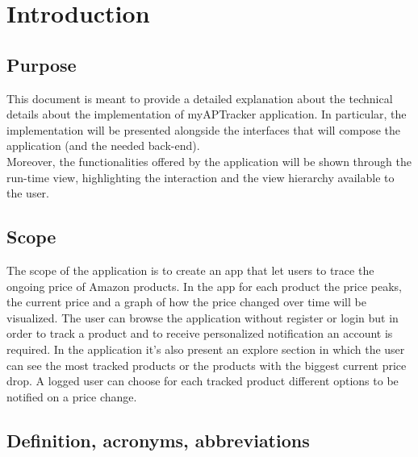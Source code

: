 \section{Introduction}


\subsection{Purpose}

This document is meant to provide a detailed explanation about the technical details about the implementation of myAPTracker application. In particular, the implementation will be presented alongside the interfaces that will compose the application (and the needed back-end). \\
Moreover, the functionalities offered by the application will be shown through the run-time view, highlighting the interaction and the view hierarchy available to the user.

\subsection{Scope}

The scope of the application is to create an app that let users to trace the ongoing price of Amazon products.
In the app for each product the price peaks, the current price and a graph of how the price changed over time will be visualized. The user can browse the application without register or login but in order to track a product and to receive personalized notification an account is required.
In the application it's also present an explore section in which the user can see the most tracked products or the products with the biggest current price drop.
A logged user can choose for each tracked product different options to be notified on a price change.


\subsection{Definition, acronyms, abbreviations}
